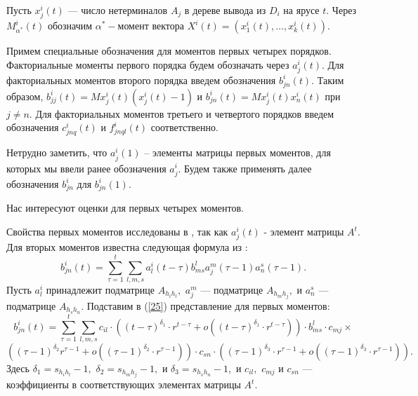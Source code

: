 \documentclass[%
11pt,a4paper]{article}
\begin{document}
{{{Пусть $x^i_j(t) $  --- число нетерминалов $A_j$ в дереве вывода из
$D_i$ на ярусе $t.$ Через $M^i_{\alpha^*}(t)$ обозначим
$\alpha^*-$момент вектора
$X^i(t)=(x^i_1(t),\ldots,x^i_k(t)).$

Примем специальные обозначения для моментов первых
четырех порядков.
Факториальные моменты первого порядка будем обозначать через $a^i_j(t).$
Для факториальных моментов второго порядка введем обозначения
$b^i_{jn}(t).$ Таким образом, $b^i_{jj}(t)=Mx^i_j(t)(x^i_j(t)-1)$ и
$b^i_{jn}(t)=Mx^i_j(t)x^i_n(t)$ при $j\neq n.$
Для факториальных моментов третьего и четвертого порядков введем обозначения
$c^i_{jnq}(t)$ и $f^i_{jnql}(t)$ соответственно.

Нетрудно заметить, что $a^i_j(1)$ -- элементы матрицы первых моментов,
для которых мы ввели ранее обозначения $a^i_j.$
Будем также применять далее обозначения
$b^i_{jn}$ для $b^i_{jn}(1).$

Нас интересуют оценки для первых четырех моментов.

Свойства первых моментов исследованы в \cite{zhil3}, так как $a^i_j(t)$ - элемент матрицы $A^t$. 
Для вторых моментов известна следующая формула из \cite{sev}:
\begin{equation}
b^i_{jn}(t)=
\sum_{\tau=1}^t \sum_{l,m,s}a^i_l(t-\tau) b^l_{ms}
a^m_j(\tau-1) a^s_n(\tau-1).
\label{25}
\end{equation}
Пусть $a^i_l$ принадлежит подматрице $A_{h_i h_l},$ $a^m_j$ --- подматрице $A_{h_m h_j},$ и $a^s_n$ --- подматрице $A_{h_s h_n}.$
Подставим в (\ref{25}) представление для первых моментов:
$$
b^i_{jn}(t)=\sum_{\tau=1}^t \sum_{l,m,s} c_{il} \cdot \left(\left(t-\tau\right)^{\delta_1}\cdot  r^{t-\tau}+o\left(\left(t-\tau\right)^{\delta_1}\cdot r^{t-\tau}\right)\right)\cdot b^l_{ms} \cdot c_{mj}\times
$$
$$
\left(\left( \tau-1\right)^{\delta_2}r^{\tau-1}+o\left(\left(\tau-1\right)^{\delta_2}\cdot r^{\tau-1}\right)\right) \cdot
c_{sn}\cdot\left(\left(\tau-1\right)^{\delta_3}\cdot r^{\tau-1}+
o\left(\left(\tau-1\right)^{\delta_3}\cdot r^{\tau-1}\right)\right).
$$
Здесь $\delta_1=s_{h_i h_l}-1,$ $\delta_2=s_{h_m h_j}-1,$ и $\delta_3=s_{h_s h_n}-1,$ и $c_{il},$ $c_{mj}$ и  $c_{sn}$ ---
коэффициенты в соответствующих элементах матрицы $A^t.$


}}}
\end{document}
